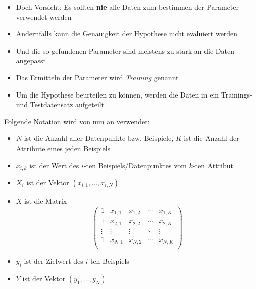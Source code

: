 \begin{frame}
\begin{itemize}[<+->]
\item Doch Vorsicht: Es sollten \textbf{nie} alle Daten zum bestimmen der Parameter verwendet werden
\item Andernfalls kann die Genauigkeit der Hypothese nicht evaluiert werden
\item Und die so gefundenen Parameter sind meistens zu stark an die Daten angepasst
\item Das Ermitteln der Parameter wird \textit{Training} genannt
\item Um die Hypothese beurteilen zu können, werden die Daten in ein Trainings- und Testdatensatz aufgeteilt
\end{itemize}
\end{frame}
\begin{frame}
Folgende Notation wird von nun an verwendet:
\begin{itemize}
\item $N$ ist die Anzahl aller Datenpunkte bzw. Beispiele, $K$ ist die Anzahl der Attribute eines jeden Beispiels
\item $x_{i,k}$ ist der Wert des $i$-ten Beispiels/Datenpunktes vom $k$-ten Attribut
\item $X_i$ ist der Vektor $(x_{i,1},\ldots,x_{i,N})$
\item $X$ ist die Matrix 
\[
\begin{pmatrix}
1 & x_{1,1} & x_{1,2} & \cdots & x_{1,K} \\
1 & x_{2,1} & x_{2,2} & \cdots & x_{2,K} \\
\vdots &\vdots & \vdots & \ddots & \vdots \\
1 & x_{N,1} & x_{N,2} & \cdots & x_{N,K}\\
\end{pmatrix}
\]
\item $y_i$ ist der Zielwert des $i$-ten Beispiels
\item $Y$ ist der Vektor $(y_1,\ldots,y_N)$
\end{itemize}
\end{frame}
